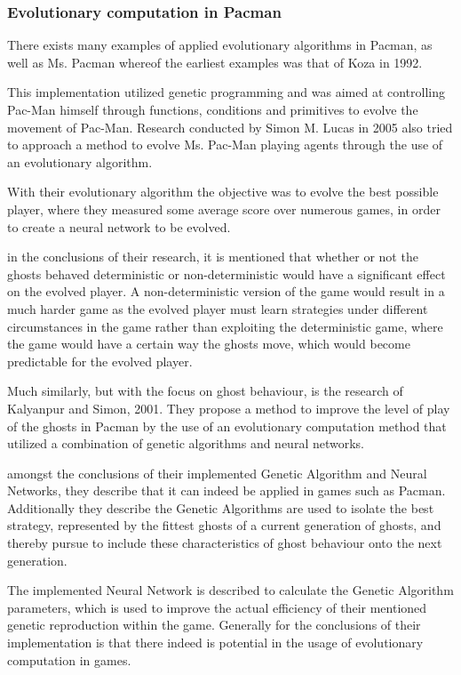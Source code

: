 \subsubsection{Evolutionary computation in Pacman}


There exists many examples of applied evolutionary algorithms in Pacman, as well as Ms. Pacman whereof the earliest examples was that of Koza in 1992.\cite{Koza1992}

This implementation utilized genetic programming and was aimed at controlling Pac-Man himself through functions, conditions and primitives to evolve the movement of Pac-Man. \cite[pp. 2]{Lucas2005}
Research conducted by Simon M. Lucas in 2005 also tried to approach a method to evolve Ms. Pac-Man playing agents through the use of an evolutionary algorithm. \cite{Lucas2005}

With their evolutionary algorithm the objective was to evolve the best possible player, where they measured some average score over numerous games, in order to create a neural network to be evolved. \cite[pp. 8]{Lucas2005}

in the conclusions of their research, it is mentioned that whether or not the ghosts behaved deterministic or non-deterministic would have a significant effect on the evolved player. A non-deterministic version of the game would result in a much harder game  as the evolved player must learn strategies under different circumstances in the game rather than exploiting the deterministic game, where the game would have a certain way the ghosts move, which would become predictable for the evolved player.\cite[pp. 8]{Lucas2005}

Much similarly, but with the focus on ghost behaviour, is the research of Kalyanpur and Simon, 2001. They propose a method to improve the level of play of the ghosts in Pacman by the use of an evolutionary computation method that utilized a combination of genetic algorithms and neural networks. \cite{Kalyanpur2001}

amongst the conclusions of their implemented Genetic Algorithm and Neural Networks, they describe that it can indeed be applied in games such as Pacman. Additionally they describe the Genetic Algorithms are used to isolate the best strategy, represented by the fittest ghosts of a current generation of ghosts, and thereby pursue to include these characteristics of ghost behaviour onto the next generation. \cite[pp. 8]{Kalyanpur2001}

The implemented Neural Network is described to calculate the Genetic Algorithm parameters, which is used to improve the actual efficiency of their mentioned genetic reproduction within the game. Generally for the conclusions of their implementation is that there indeed is potential in the usage of evolutionary computation in games.

